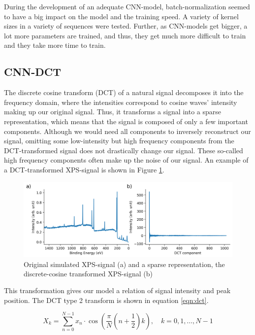 During the development of an adequate CNN-model, batch-normalization seemed to have a big impact on the model and the training speed. A variety of kernel sizes in a variety of sequences were tested. Further, as CNN-models get bigger, a lot more parameters are trained, and thus, they get much more difficult to train and they take more time to train.


\subsection{CNN-DCT}
The discrete cosine transform (DCT) of a natural signal decomposes it into the frequency domain, where the intensities correspond to cosine waves' intensity making up our original signal. Thus, it transforms a signal into a sparse representation, which means that the signal is composed of only a few important components. Although we would need all components to inversely reconstruct our signal, omitting some low-intensity but high frequency components from the DCT-transformed signal does not drastically change our signal. These so-called high frequency components often make up the noise of our signal. An example of a DCT-transformed XPS-signal is shown in Figure \ref{fig:dct}.

\begin{figure}[H]
    \centering
    \includegraphics[width=\textwidth]{Figures/dct.png}
    \caption{Original simulated XPS-signal (a) and a sparse representation, the discrete-cosine transformed XPS-signal (b)}
    \label{fig:dct}
\end{figure}

This transformation gives our model a relation of signal intensity and peak position. The DCT type 2 transform is shown in equation \ref{eqn:dct}.

\begin{equation}
\label{eqn:dct}
X_k = \sum_{n=0}^{N-1} x_n \cdot \cos\left(\frac{\pi}{N}\left(n + \frac{1}{2}\right)k\right), \quad k = 0, 1, \ldots, N-1
\end{equation}

